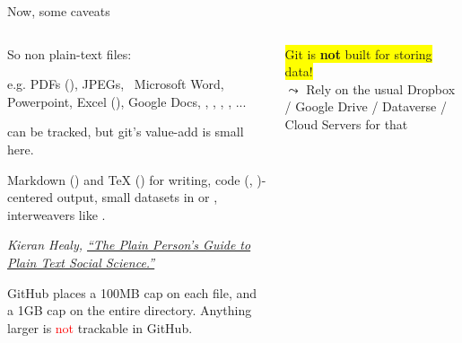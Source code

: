 \documentclass[ignorenonframetext, 10pt, aspectratio=169]{beamer}
\begin{document}
\begin{frame}{Now, some caveats}
\vspace{-0.3cm}
\begin{columns}[T]
\begin{column}{0.6\textwidth}

  So non plain-text files:\\

  \medskip

   {\small e.g.  PDFs (), \pause JPEGs,\pause~ Microsoft Word, \pause Powerpoint,  Excel (), Google Docs, \pause {}, , , , ...}

 can be tracked, but git's value-add is small here.
\pause

  \pause

 {\small Markdown () and TeX () for writing,  \pause code (, )-centered output, small datasets in  or , \pause interweavers  like .} 

\bigskip
 {\footnotesize \emph{Kieran Healy, \href{https://kieranhealy.org/publications/plain-person-text/}{``The Plain Person’s Guide to Plain Text Social Science.''}}}

\medskip

 {\footnotesize GitHub places a 100MB cap on each file, and a 1GB cap on the entire directory. Anything larger is \textcolor{red}{not} trackable in GitHub. }

\end{column}
\begin{column}{0.4\textwidth}
  \colorbox{yellow}{Git is {\textbf{not}} built for storing data!}\\
\centering
{}
\flushleft
$\leadsto$ Rely on the usual Dropbox / Google Drive / Dataverse / Cloud Servers for that
\end{column}
\end{columns}
\end{frame}
\end{document}
